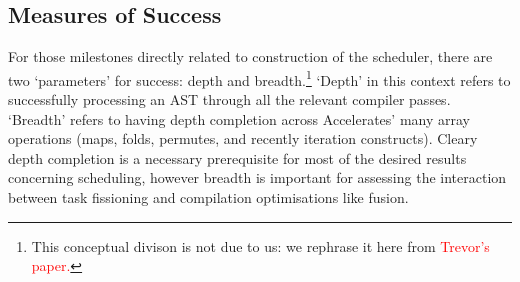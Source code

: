 \documentclass[a4paper,12pt]{article}
\newcommand{\red}[1]{\textcolor{red}{#1}}
\begin{document}
\subsection{Measures of Success}
For those milestones directly related to construction of the scheduler, there are two `parameters' for success: depth and breadth.\footnote{This conceptual divison is not due to us: we rephrase it here from \red{Trevor's paper.}} 
`Depth' in this context refers to successfully processing an AST through all the relevant compiler passes. 
`Breadth' refers to having depth completion across Accelerates' many array operations (maps, folds, permutes, and recently iteration constructs).
Cleary depth completion is a necessary prerequisite for most of the desired results concerning scheduling, however breadth is important for assessing the interaction between task fissioning and compilation optimisations like fusion.

\pagebreak

\footnotesize



\end{document}
